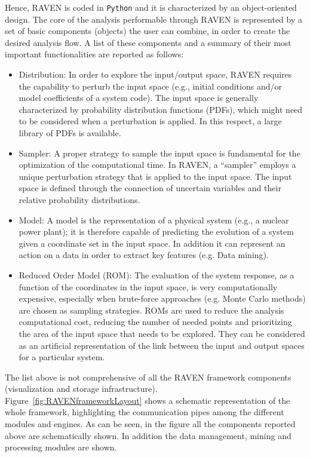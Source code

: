 Hence, RAVEN is coded in \texttt{Python} and it is characterized by an object-oriented design. The core of the analysis performable through RAVEN is represented by a set of basic components (objects) the user can combine, in order to create the desired analysis flow. A list of these components and a summary of their most important functionalities are reported as follows:
\begin{itemize}
\item	Distribution: In order to explore the input/output space, RAVEN requires the capability to perturb the input space (e.g., initial conditions and/or model coefficients of a system code). The input space is generally characterized by probability distribution functions (PDFs), which might need to be considered when a perturbation is applied. In this respect, a large library of PDFs is available.
\item Sampler: A proper strategy to sample the input space is fundamental for the optimization of the computational time. In RAVEN, a ``sampler'' employs a unique perturbation strategy that is applied to the input space. The input space is defined through the connection of uncertain variables and their relative probability distributions.
\item Model: A model is the representation of a physical system (e.g., a nuclear power plant); it is therefore capable of predicting the evolution of a system given a coordinate set in the input space. In addition it can represent an
action on a data in order to extract key features (e.g. Data mining).
\item Reduced Order Model (ROM): The evaluation of the system response, as a function of the coordinates in the input space, is very computationally expensive, especially when brute-force approaches (e.g. Monte Carlo methods) are chosen as sampling strategies. ROMs are used to reduce the analysis computational cost, reducing the number of needed points and prioritizing the area of the input space that needs to be explored. They can be considered as an artificial representation of the link between the input and output spaces for a particular system.
\end{itemize}
The list above is not comprehensive of all the RAVEN framework components (visualization and storage infrastructure).
\\ Figure~\ref{fig:RAVENframeworkLayout} shows a schematic representation of the whole framework, highlighting the communication pipes among the different modules and engines. As can be seen, in the figure all the components reported above are schematically shown. In addition the data management, mining and processing modules are shown.

